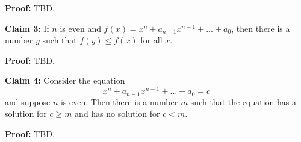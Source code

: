 \vs

\textbf{Proof:} TBD.

\vs

\textbf{Claim 3:} If $n$ is even and
$f(x)=x^{n}+a_{n-1}x^{n-1}+\ldots+a_{0}$, then there is a number $y$ such
that $f(y)\leq f(x)$ for all $x$.

\vs

\textbf{Proof:} TBD.

\vs

\textbf{Claim 4:} Consider the equation
\[x^{n}+a_{n-1}x^{n-1}+\ldots+a_{0}=c\]
and suppose $n$ is even. Then there is a number $m$ such that the
equation has a solution for $c\geq m$ and has no solution for $c<m$.

\vs

\textbf{Proof:} TBD.

\vs



